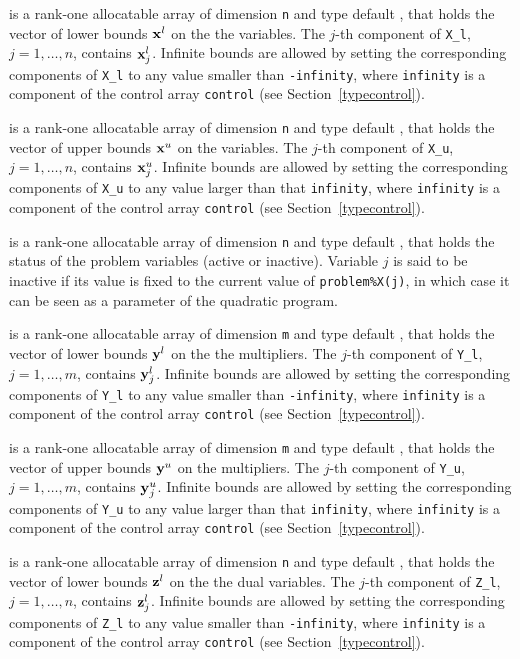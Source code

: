 \documentclass{galahad}
\begin{document}
\begin{description}
 is a rank-one allocatable array of dimension {\tt n} and type
default \realdp, that holds
the vector of lower bounds ${\mathbf{x}}^{l}$ on the the variables.
The $j$-th component of {\tt X\_l}, $j = 1, \ldots , n$,
contains ${\mathbf{x}}_{j}^{l}$.
Infinite bounds are allowed by setting the corresponding
components of {\tt X\_l} to any value smaller than {\tt -infinity},
where {\tt infinity} is a component of the control array {\tt control}
(see Section~\ref{typecontrol}).

 is a rank-one allocatable array of dimension {\tt n} and type
default \realdp, that holds
the vector of upper bounds ${\mathbf{x}}^{u}$ on the variables.
The $j$-th component of {\tt X\_u}, $j = 1, \ldots , n$,
contains ${\mathbf{x}}_{j}^{u}$.
Infinite bounds are allowed by setting the corresponding
components of {\tt X\_u} to any value larger than that {\tt infinity},
where {\tt infinity} is a component of the control array {\tt control}
(see Section~\ref{typecontrol}).

 is a rank-one allocatable array of dimension {\tt n} and type
default \integer, that holds the status of the problem variables (active or
inactive). Variable $j$ is said to be inactive if its value is fixed to the
current value of {\tt problem\%X(j)}, in which case it can be seen as a
parameter of the quadratic program.

 is a rank-one allocatable array of dimension {\tt m} and type
default \realdp, that holds
the vector of lower bounds ${\mathbf{y}}^{l}$ on the the multipliers.
The $j$-th component of {\tt Y\_l}, $j = 1, \ldots , m$,
contains ${\mathbf{y}}_{j}^{l}$.
Infinite bounds are allowed by setting the corresponding
components of {\tt Y\_l} to any value smaller than {\tt -infinity},
where {\tt infinity} is a component of the control array {\tt control}
(see Section~\ref{typecontrol}).

 is a rank-one allocatable array of dimension {\tt m} and type
default \realdp, that holds
the vector of upper bounds ${\mathbf{y}}^{u}$ on the multipliers.
The $j$-th component of {\tt Y\_u}, $j = 1, \ldots , m$,
contains ${\mathbf{y}}_{j}^{u}$.
Infinite bounds are allowed by setting the corresponding
components of {\tt Y\_u} to any value larger than that {\tt infinity},
where {\tt infinity} is a component of the control array {\tt control}
(see Section~\ref{typecontrol}).

 is a rank-one allocatable array of dimension {\tt n} and type
default \realdp, that holds
the vector of lower bounds ${\mathbf{z}}^{l}$ on the the dual variables.
The $j$-th component of {\tt Z\_l}, $j = 1, \ldots , n$,
contains ${\mathbf{z}}_{j}^{l}$.
Infinite bounds are allowed by setting the corresponding
components of {\tt Z\_l} to any value smaller than {\tt -infinity},
where {\tt infinity} is a component of the control array {\tt control}
(see Section~\ref{typecontrol}).


\end{description}
\end{document}
